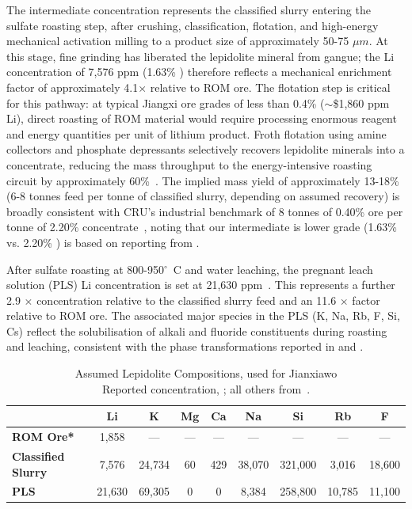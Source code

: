 The intermediate concentration represents the classified slurry entering the sulfate roasting step, after crushing, classification, flotation, and high-energy mechanical activation milling to a product size of approximately 50-75 $\mu m$. At this stage, fine grinding has liberated the lepidolite mineral from gangue; the Li concentration of 7,576 ppm (1.63\% ) therefore reflects a mechanical enrichment factor of approximately 4.1$\times$ relative to ROM ore. The flotation step is critical for this pathway: at typical Jiangxi ore grades of less than 0.4\%  ($\sim$\$1,860 ppm Li), direct roasting of ROM material would require processing enormous reagent and energy quantities per unit of lithium product. Froth flotation using amine collectors and phosphate depressants selectively recovers lepidolite minerals into a concentrate, reducing the mass throughput to the energy-intensive roasting circuit by approximately 60\%~\cite{jiaoKeyTechnologiesDevelopment2024}. The implied mass yield of approximately 13-18\% (6-8 tonnes feed per tonne of classified slurry, depending on assumed recovery) is broadly consistent with CRU's industrial benchmark of 8 tonnes of 0.40\%  ore per tonne of 2.20\%  concentrate~\cite{fisherScrutinisingLithiumTechnology2022}, noting that our intermediate is lower grade (1.63\% vs. 2.20\% ) is based on reporting from \citet{garrettHandbookLithiumNatural2004}.

After sulfate roasting at 800-950$^\circ$~C and water leaching, the pregnant leach solution (PLS) Li concentration is set at 21,630 ppm~\cite{garrettHandbookLithiumNatural2004}. This represents a further 2.9 $\times$ concentration relative to the classified slurry feed and an 11.6 $\times$ factor relative to ROM ore. The associated major species in the PLS (K, Na, Rb, F, Si, Cs) reflect the solubilisation of alkali and fluoride constituents during roasting and leaching, consistent with the phase transformations reported in \citet{yanExtractionLithiumLepidolite2012} and \citet{dengSystematicReviewSulfate2026}.

\begin{table}[h]
\centering
\caption[Assumed Lepidolite Compositions]{Assumed Lepidolite Compositions, used for Jianxiawo \\
\small *Reported concentration, \citet{zhangChinaHasDomestic2025}; all others from~\cite{garrettHandbookLithiumNatural2004}.}
\label{tab:c-lepidolite-compositions}
\begin{tabular}{|l|c|c|c|c|c|c|c|c|}
\hline
 & \textbf{Li} & \textbf{K} & \textbf{Mg} & \textbf{Ca} & \textbf{Na} & \textbf{Si} & \textbf{Rb} & \textbf{F} \\
\hline
\textbf{ROM Ore*}        & 1,858  & ---    & ---  & ---  & ---    & ---     & ---    & ---    \\
\hline
\textbf{Classified Slurry} & 7,576 & 24,734 & 60   & 429  & 38,070 & 321,000 & 3,016  & 18,600 \\
\hline
\textbf{PLS}             & 21,630 & 69,305 & 0    & 0    & 8,384  & 258,800 & 10,785 & 11,100 \\
\hline
\end{tabular}
\end{table}




